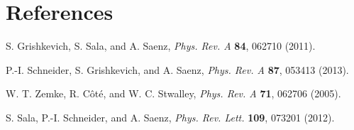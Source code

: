 \documentclass[aps,pre,twocolumn,superscriptaddress,showpacs]{revtex4-1}
\begin{document}
\section*{References}
\begin{thebibliography}{99}
    S. Grishkevich, S. Sala, and A. Saenz, 
                                  {\it Phys. Rev. A} \textbf{84}, 062710 (2011).

   P.-I. Schneider, S. Grishkevich, and A. Saenz, 
                                  {\it Phys. Rev. A} \textbf{87}, 053413 (2013).

   W. T. Zemke, R. C\^ot\'e, and W. C. Stwalley, 
                                   {\it Phys. Rev. A} \textbf{71}, 062706 (2005).

   S. Sala, P.-I. Schneider, and A. Saenz, 
                                   {\it Phys. Rev. Lett.} \textbf{109}, 073201 (2012).
\end{thebibliography}

\newpage
\end{document}
